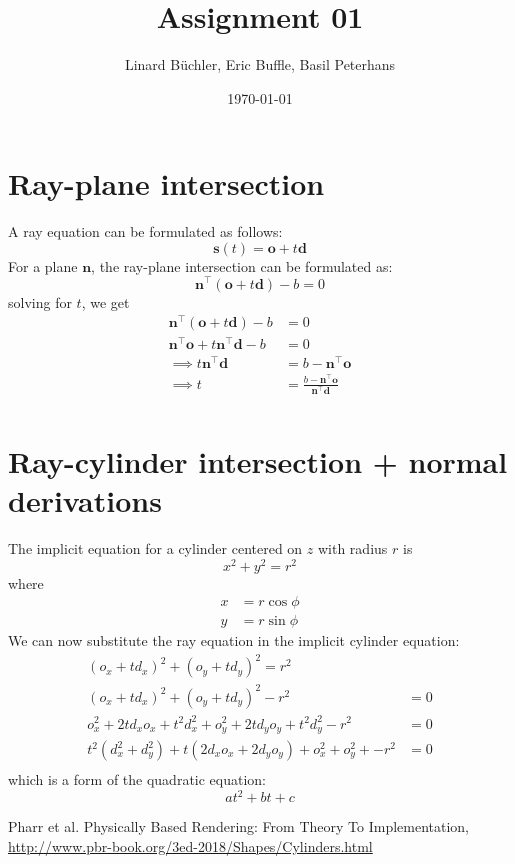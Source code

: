 \documentclass[a4paper, 12pt]{article}
\begin{document}
	\setlength{\parindent}{0cm}
	\renewcommand{\baselinestretch}{0.5}
	\title{Assignment 01}
	\author{ Linard Büchler, Eric Buffle, Basil Peterhans}
	\date{\today}
	\maketitle
	\tableofcontents{}
\section{Ray-plane intersection}
A ray equation can be formulated as follows:
$$
\textbf{s}(t) = \textbf{o}+ t\textbf{d}
$$
For a plane $\textbf{n}$, the ray-plane intersection can be formulated as:
$$
\textbf{n}^\top (\textbf{o}+ t\textbf{d})- b = 0
$$
solving for $t$, we get
\begin{align*}
\textbf{n}^\top (\textbf{o}+ t\textbf{d})- b &= 0\\
\textbf{n}^\top\textbf{o} + t\textbf{n}^\top\textbf{d} - b &=0\\
\implies t\textbf{n}^\top\textbf{d} &=b - \textbf{n}^\top\textbf{o}\\
\implies t &=\frac{b - \textbf{n}^\top\textbf{o}}{\textbf{n}^\top\textbf{d}} \\
\end{align*}
\section{Ray-cylinder intersection + normal derivations}
The implicit equation for a cylinder centered on $z$ with radius $r$ is
$$
x^2 + y^2 = r^2
$$
where
\begin{align*}
  x&=r\cos\phi\\
  y&=r\sin\phi
\end{align*}
We can now substitute the ray equation in the implicit cylinder equation:
\begin{align*}
(o_x+ td_x)^2 + (o_y+ td_y)^2 = r^2\\
(o_x+ td_x)^2 + (o_y+ td_y)^2 -  r^2 &= 0\\
o_x^2 + 2td_xo_x + t^2d_x^2 + o_y^2 + 2td_yo_y + t^2d_y^2-  r^2 &= 0\\
t^2(d_x^2 + d_y^2) + t(2d_xo_x + 2d_yo_y) + o_x^2  + o_y^2 +  - r^2 &= 0\\
\end{align*}
which is a form of the quadratic equation:
$$
at^2 + bt + c
$$
\begin{thebibliography}{10} %
   Pharr et al. Physically Based Rendering:
  From Theory To Implementation, \url{http://www.pbr-book.org/3ed-2018/Shapes/Cylinders.html}%
%
%
%

\end{thebibliography}
\end{document}
